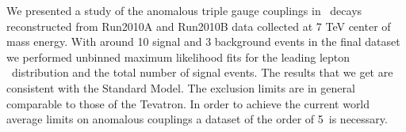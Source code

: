 We presented a study of the anomalous triple gauge couplings in \wwll\
decays reconstructed from Run2010A and Run2010B data collected at 7
TeV center of mass energy. With around 10 signal and 3 background
events in the final dataset we performed unbinned maximum likelihood
fits for the leading lepton \pt\ distribution and the total number of
signal events. The results that we get are consistent with the
Standard Model. The exclusion limits are in general comparable to those
of the Tevatron. In order to achieve the
current world average limits on anomalous couplings a dataset of the
order of 5~\ifb is necessary.
